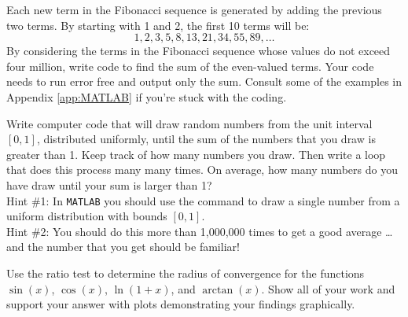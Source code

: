 \begin{problem}
    Each new term in the Fibonacci sequence is generated by adding the previous two terms.
    By starting with 1 and 2, the first 10 terms will be:
    \[ 1, 2, 3, 5, 8, 13, 21, 34, 55, 89, \dots \]
    By considering the terms in the Fibonacci sequence whose values do not exceed four
    million, write code to find the sum of the even-valued terms. Your code needs to run
    error free and output only the sum.  Consult some of the examples in Appendix \ref{app:MATLAB} if you're stuck with
    the coding.
\end{problem}

\begin{problem}
    Write computer code that will draw random numbers from the unit interval $[0,1]$,
    distributed uniformly, until
    the sum of the numbers that you draw is greater than 1.  Keep track of how many
    numbers you draw.  Then write a loop that does this process many many times.  On
    average, how many numbers do you have draw until your sum is larger than 1? \\ Hint
    \#1:
    In \texttt{MATLAB} you should use the  command to draw a single
    number from a uniform distribution with bounds $[0,1]$. \\ Hint \#2: You should do
    this more than 1,000,000 times to get a good average \ldots and the number that you
    get should be familiar!
\end{problem}

\begin{problem}
    Use the ratio test to determine the radius of convergence for the functions $\sin(x)$, $\cos(x)$,
    $\ln(1+x)$, and $\arctan(x)$.  Show all of your work and support your answer with
    plots demonstrating your findings graphically.
\end{problem}

